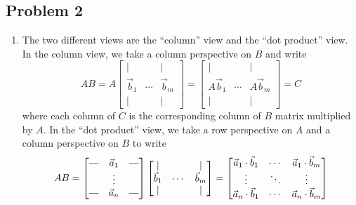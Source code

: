 \documentclass[11pt]{article}
\newcommand{\rotvert}{\rotatebox[origin=c]{90}{$\vert$}}
\begin{document}
\subsection*{Problem 2}
\begin{enumerate}
    \item[(a)] The two different views are the ``column'' view and the ``dot product'' view. In the column view, we take a column perspective on $B$ and write \[ AB=A\begin{bmatrix} \mid &  & \mid \\ \vec{b}_1 & \cdots & \vec{b}_m \\ \mid &  & \mid \end{bmatrix}= \begin{bmatrix} \mid &  & \mid \\ A\vec{b}_1 & \cdots & A\vec{b}_m \\ \mid &  & \mid \end{bmatrix}=C \] where each column of $C$ is the corresponding column of $B$ matrix multiplied by $A$. In the ``dot product'' view, we take a row perspective on $A$ and a column perspective on $B$ to write \[ AB = \begin{bmatrix} \rotvert & \vec{a}_1 & \rotvert \\  & \vdots &  \\ \rotvert & \vec{a}_n & \rotvert \end{bmatrix}\begin{bmatrix} \mid &  & \mid \\ \vec{b}_1 & \cdots & \vec{b}_m \\ \mid &  & \mid \end{bmatrix}= \begin{bmatrix} \vec{a}_1\cdot \vec{b}_1 & \cdots & \vec{a}_1\cdot \vec{b}_m \\ \vdots & \ddots & \vdots \\ \vec{a}_n\cdot \vec{b}_1 & \cdots & \vec{a}_n\cdot \vec{b}_m \end{bmatrix} \]

\end{enumerate}
\end{document}
